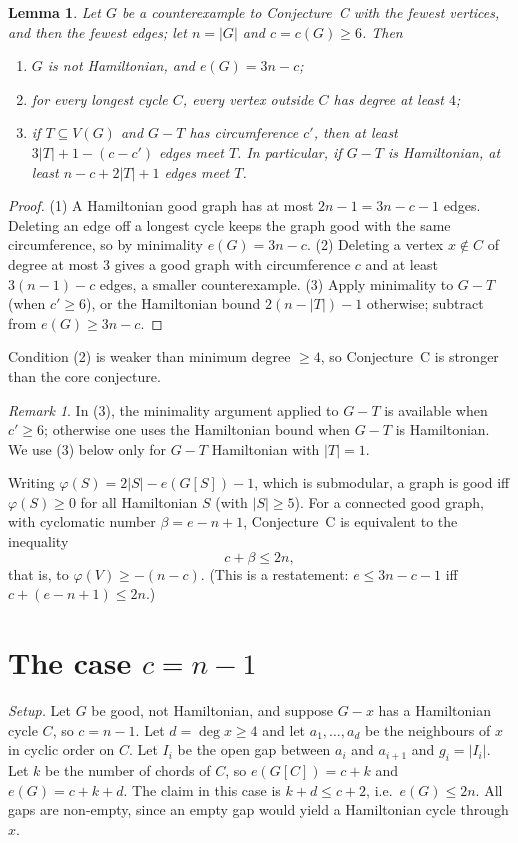 \documentclass[11pt]{amsart}
\newtheorem{lemma}{Lemma}
\theoremstyle{remark}
\newtheorem{remark}{Remark}
\begin{document}
\begin{lemma}\label{lem:min}
Let $G$ be a counterexample to Conjecture~C with the fewest vertices, and then the fewest edges; let $n=|G|$ and $c=c(G)\ge6$. Then
\begin{enumerate}
\item $G$ is not Hamiltonian, and $e(G)=3n-c$;
\item for every longest cycle $C$, every vertex outside $C$ has degree at least $4$;
\item if $T\subseteq V(G)$ and $G-T$ has circumference $c'$, then at least $3|T|+1-(c-c')$ edges meet $T$. In particular, if $G-T$ is Hamiltonian, at least $n-c+2|T|+1$ edges meet $T$.
\end{enumerate}
\end{lemma}
\begin{proof}
(1) A Hamiltonian good graph has at most $2n-1=3n-c-1$ edges. Deleting an edge off a longest cycle keeps the graph good with the same circumference, so by minimality $e(G)=3n-c$. (2) Deleting a vertex $x\notin C$ of degree at most $3$ gives a good graph with circumference $c$ and at least $3(n-1)-c$ edges, a smaller counterexample. (3) Apply minimality to $G-T$ (when $c'\ge6$), or the Hamiltonian bound $2(n-|T|)-1$ otherwise; subtract from $e(G)\ge 3n-c$.
\end{proof}

Condition (2) is weaker than minimum degree $\ge4$, so Conjecture~C is stronger than the core conjecture.

\begin{remark}
In (3), the minimality argument applied to $G-T$ is available when $c'\ge6$; otherwise one uses the Hamiltonian bound when $G-T$ is Hamiltonian. We use (3) below only for $G-T$ Hamiltonian with $|T|=1$.
\end{remark}

Writing $\varphi(S)=2|S|-e(G[S])-1$, which is submodular, a graph is good iff $\varphi(S)\ge0$ for all Hamiltonian $S$ (with $|S|\ge5$). For a connected good graph, with cyclomatic number $\beta=e-n+1$, Conjecture~C is equivalent to the inequality
\[
c+\beta\le 2n,
\]
that is, to $\varphi(V)\ge-(n-c)$. (This is a restatement: $e\le 3n-c-1$ iff $c+(e-n+1)\le 2n$.)

\section{The case $c=n-1$}

\emph{Setup.} Let $G$ be good, not Hamiltonian, and suppose $G-x$ has a Hamiltonian cycle $C$, so $c=n-1$. Let $d=\deg x\ge4$ and let $a_1,\dots,a_d$ be the neighbours of $x$ in cyclic order on $C$. Let $I_i$ be the open gap between $a_i$ and $a_{i+1}$ and $g_i=|I_i|$. Let $k$ be the number of chords of $C$, so $e(G[C])=c+k$ and $e(G)=c+k+d$. The claim in this case is $k+d\le c+2$, i.e.\ $e(G)\le 2n$. All gaps are non-empty, since an empty gap would yield a Hamiltonian cycle through $x$.
\end{document}
